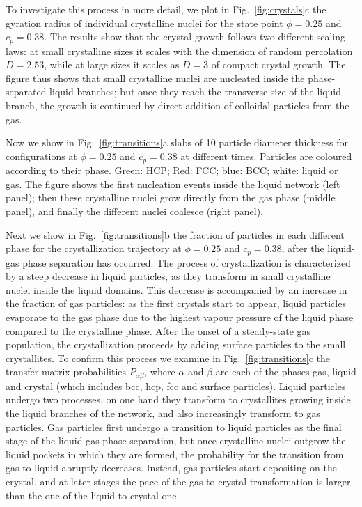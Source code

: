 \documentclass[a4paper,preprint,superscriptaddress]{revtex4}
\begin{document}
To investigate this process in more detail, we plot in Fig.~\ref{fig:crystals}c the gyration radius of individual crystalline nuclei for the state point
$\phi=0.25$ and $c_p=0.38$. The results show that the crystal growth follows two different scaling laws: at small crystalline sizes it scales with
the dimension of random percolation $D=2.53$, while at large sizes it scales as $D=3$ of compact crystal growth. The figure thus shows that
small crystalline nuclei are nucleated inside the phase-separated liquid branches; but once they reach the transverse size of the liquid branch, the growth is continued
by direct addition of colloidal particles from the gas.

Now we show in Fig.~\ref{fig:transitions}a slabs of 10 particle diameter thickness for configurations at $\phi=0.25$ and $c_p=0.38$ at different times.
Particles are coloured according to their phase. Green: HCP; Red: FCC; blue: BCC; white: liquid or gas. The figure shows the first nucleation
events inside the liquid network (left panel); then these crystalline nuclei grow directly from the gas phase (middle panel), and finally
the different nuclei coalesce (right panel). 

Next we show in Fig.~\ref{fig:transitions}b the fraction of particles in each different phase for the crystallization trajectory at
$\phi=0.25$ and $c_p=0.38$, after the liquid-gas phase separation has occurred. The process of crystallization is characterized
by a steep decrease in liquid particles, as they transform in small crystalline nuclei inside the liquid domains. This decrease
is accompanied by an increase in the fraction of gas particles: as the first crystals start to appear, liquid particles evaporate
to the gas phase due to the highest vapour pressure of the liquid phase compared to the crystalline phase. After the onset
of a steady-state gas population, the crystallization proceeds by adding surface particles to the small crystallites. To confirm this process we
examine in Fig.~\ref{fig:transitions}c the transfer matrix probabilities $P_{\alpha\beta}$, where $\alpha$ and $\beta$ are each of the
phases gas, liquid and crystal (which includes bcc, hcp, fcc and surface particles). Liquid particles undergo two processes, on one
hand they transform to crystallites growing inside the liquid branches of the network, and also increasingly transform to gas particles.
Gas particles first undergo a transition to liquid particles as the final stage of the liquid-gas phase separation, but once
crystalline nuclei outgrow the liquid pockets in which they are formed, the probability for the transition from gas to liquid
abruptly decreases. Instead, gas particles start depositing on the crystal, and at later stages the pace of the gas-to-crystal transformation
is larger than the one of the liquid-to-crystal one.
\end{document}
